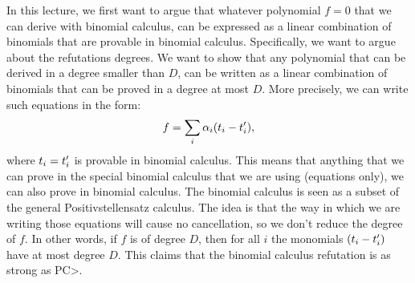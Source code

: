 \documentclass[a4paper,twoside,justified]{tufte-handout}
\begin{document}
In this lecture, we first want to argue that whatever polynomial $f=0$ that we can derive with binomial calculus, can be expressed as a linear combination of binomials that are provable in binomial calculus. Specifically, we want to argue about the refutations degrees. We want to show that any polynomial that can be derived in a degree smaller than $D$, can  be written as a linear combination of binomials that can be proved in a degree at most $D$.
More precisely,  we can write such equations in the form:
\begin{equation*}
f  = \sum_i \alpha_i (t_i-t_i\rq{}),
\end{equation*}
where $t_i = t_i\rq{}$ is provable in binomial calculus. This means that anything that we can prove in the  special binomial calculus that we are using (equations only), we can also prove in binomial calculus. The binomial calculus is seen as a subset of the general Positivstellensatz calculus. The idea is that the way in which we are writing those equations will cause no cancellation, so we don\rq{}t reduce the degree of $f$. In other words, if $f$ is of degree $D$, then for all $i$ the monomials $ (t_i-t_i\rq{})$ have at most degree $D$. This claims that the binomial calculus refutation is as strong as PC>.
\end{document}
